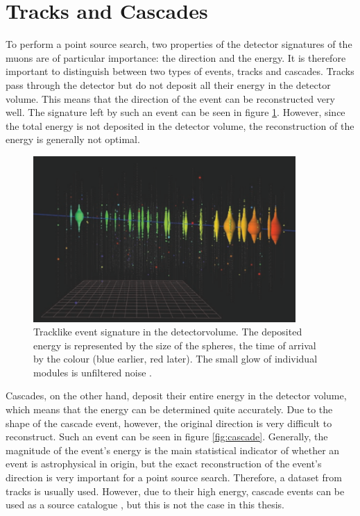 \section{Tracks and Cascades}

To perform a point source search, two properties of the detector signatures of the muons are of particular importance: the direction and the energy.
It is therefore important to distinguish between two types of events, tracks and cascades.
Tracks pass through the detector but do not deposit all their energy in the detector volume.
This means that the direction of the event can be reconstructed very well.
The signature left by such an event can be seen in figure \ref{fig:track}.
However, since the total energy is not deposited in the detector volume, the reconstruction of the energy is generally not optimal.
\begin{figure}
    \centering
    \includegraphics[width=10cm]{Plots/01_7_icecube/track.png}
    \caption{Tracklike event signature in the detectorvolume. The deposited energy is represented by the size of the spheres, the time of arrival by the colour (blue earlier, red later). The small glow of individual modules is unfiltered noise \cite{spiering}.}
    \label{fig:track}
\end{figure}
Cascades, on the other hand, deposit their entire energy in the detector volume, which means that the energy can be determined quite accurately.
Due to the shape of the cascade event, however, the original direction is very difficult to reconstruct.
Such an event can be seen in figure \ref{fig:cascade}.
Generally, the magnitude of the event's energy is the main statistical indicator of whether an event is astrophysical in origin, but the exact reconstruction of the event's direction is very important for a point source search.
Therefore, a dataset from tracks is usually used.
However, due to their high energy, cascade events can be used as a source catalogue \cite{steve_und_mirco}, but this is not the case in this thesis.
